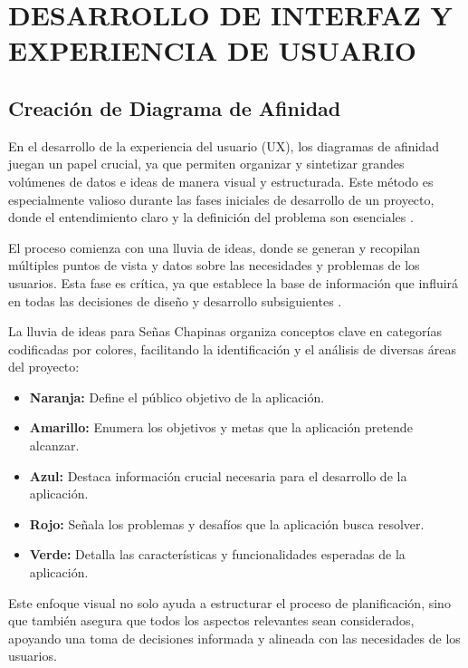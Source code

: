 \section{DESARROLLO DE INTERFAZ Y EXPERIENCIA DE USUARIO}

\subsection{Creación de Diagrama de Afinidad}

En el desarrollo de la experiencia del usuario (UX), los diagramas de afinidad juegan un papel crucial, ya que permiten organizar y sintetizar grandes volúmenes de datos e ideas de manera visual y estructurada. Este método es especialmente valioso durante las fases iniciales de desarrollo de un proyecto, donde el entendimiento claro y la definición del problema son esenciales \cite{Maze2024}.

El proceso comienza con una lluvia de ideas, donde se generan y recopilan múltiples puntos de vista y datos sobre las necesidades y problemas de los usuarios. Esta fase es crítica, ya que establece la base de información que influirá en todas las decisiones de diseño y desarrollo subsiguientes \cite{Maze2024}.

La lluvia de ideas para Señas Chapinas organiza conceptos clave en categorías codificadas por colores, facilitando la identificación y el análisis de diversas áreas del proyecto:

\begin{itemize}
    \item \textbf{Naranja:} Define el público objetivo de la aplicación.
    \item \textbf{Amarillo:} Enumera los objetivos y metas que la aplicación pretende alcanzar.
    \item \textbf{Azul:} Destaca información crucial necesaria para el desarrollo de la aplicación.
    \item \textbf{Rojo:} Señala los problemas y desafíos que la aplicación busca resolver.
    \item \textbf{Verde:} Detalla las características y funcionalidades esperadas de la aplicación.
\end{itemize}

Este enfoque visual no solo ayuda a estructurar el proceso de planificación, sino que también asegura que todos los aspectos relevantes sean considerados, apoyando una toma de decisiones informada y alineada con las necesidades de los usuarios.


